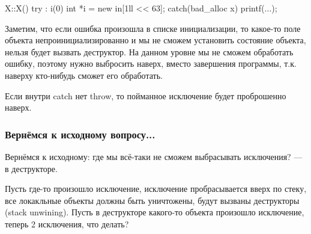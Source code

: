 \begin{cppcode}
X::X() try : i(0) {
    int *i = new in[1ll << 63];
} catch(bad_alloc x) {
    printf(...);
}
\end{cppcode}

Заметим, что если ошибка произошла в списке инициализации, то какое-то поле объекта непроинициализированно и мы не сможем установить состояние объекта, нельзя будет вызвать деструктор. На данном уровне мы не сможем обработать ошибку, поэтому нужно выбросить наверх, вместо завершения программы, т.к. наверху кто-нибудь сможет его обработать.

Если внутри catch нет throw, то пойманное исключение будет проброшенно наверх.

\subsubsection{Вернёмся к исходному вопросу...}

Вернёмся к исходному: где мы всё-таки не сможем выбрасывать исключения? --- в деструкторе.

Пусть где-то произошло исключение, исключение пробрасывается вверх по стеку, все локакльные объекты должны быть уничтожены, будут вызваны деструкторы (stack unwining). Пусть в деструкторе какого-то объекта произошло исключение, теперь 2 исключения, что делать?